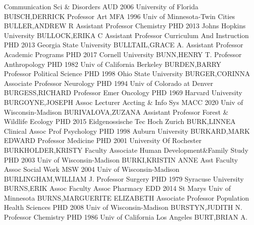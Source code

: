 \documentclass[
]{article}
\begin{document}
\textbar Communication Sci \& Disorders \textbar{} 
\textbar AUD 2006 University of Florida \textbar BUISCH,DERRICK
\textbar Professor \textbar Art \textbar{}  \textbar MFA 1996
Univ of Minnesota-Twin Cities \textbar BULLER,ANDREW R
\textbar Assistant Professor \textbar Chemistry \textbar{} 
\textbar PHD 2013 Johns Hopkins University \textbar BULLOCK,ERIKA C
\textbar Assistant Professor \textbar Curriculum And Instruction
\textbar{}  \textbar PHD 2013 Georgia State University
\textbar BULLTAIL,GRACE A. \textbar Assistant Professor
\textbar Academic Programs \textbar{}  \textbar PHD 2017
Cornell University \textbar BUNN,HENRY T. \textbar Professor
\textbar Anthropology \textbar{}  \textbar PHD 1982 Univ of
California Berkeley \textbar BURDEN,BARRY \textbar Professor
\textbar Political Science \textbar{}  \textbar PHD 1998 Ohio
State University \textbar BURGER,CORINNA \textbar Associate Professor
\textbar Neurology \textbar{}  \textbar PHD 1994 Univ of
Colorado at Denver \textbar BURGESS,RICHARD \textbar Professor Emer
\textbar Oncology \textbar{}  \textbar PHD 1969 Harvard
University \textbar BURGOYNE,JOSEPH \textbar Assoc Lecturer
\textbar Accting \& Info Sys \textbar{}  \textbar MACC 2020
Univ of Wisconsin-Madison \textbar BURIVALOVA,ZUZANA \textbar Assistant
Professor \textbar Forest \& Wildlife Ecology \textbar{} 
\textbar PHD 2015 Eidgenossische Tec Hoch Zurich \textbar BURK,LINNEA
\textbar Clinical Assoc Prof \textbar Psychology \textbar{} 
\textbar PHD 1998 Auburn University \textbar BURKARD,MARK EDWARD
\textbar Professor \textbar Medicine \textbar{}  \textbar PHD
2001 University Of Rochester \textbar BURKHOLDER,KRISTY \textbar Faculty
Associate \textbar Human Development\&Family Study \textbar{}
 \textbar PHD 2003 Univ of Wisconsin-Madison
\textbar BURKI,KRISTIN ANNE \textbar Asst Faculty Assoc \textbar Social
Work \textbar{}  \textbar MSW 2004 Univ of Wisconsin-Madison
\textbar BURLINGHAM,WILLIAM J. \textbar Professor \textbar Surgery
\textbar{}  \textbar PHD 1979 Syracuse University
\textbar BURNS,ERIK \textbar Assoc Faculty Assoc \textbar Pharmacy
\textbar{}  \textbar EDD 2014 St Marys Univ of Minnesota
\textbar BURNS,MARGUERITE ELIZABETH \textbar Associate Professor
\textbar Population Health Sciences \textbar{}  \textbar PHD
2008 Univ of Wisconsin-Madison \textbar BURSTYN,JUDITH N.
\textbar Professor \textbar Chemistry \textbar{} 
\textbar PHD 1986 Univ of California Los Angeles \textbar BURT,BRIAN A.
\end{document}
